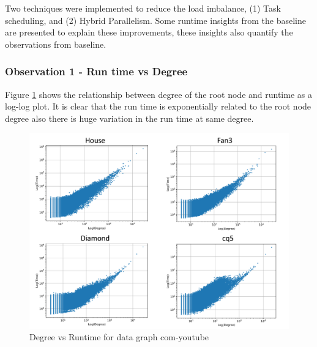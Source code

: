 {Two techniques were implemented to reduce the load imbalance, (1) Task scheduling, and (2) Hybrid Parallelism.
Some runtime insights from the baseline are presented to explain these improvements, these insights also quantify the observations from baseline.
\subsubsection*{Observation 1 - Run time vs Degree}
Figure \ref{fig:runtime-vs-degree} shows the relationship between degree of the root node and runtime as a log-log plot.
It is clear that the run time is exponentially related to the root node degree also there is huge variation in the run time at same degree.
\begin{figure}
    \includegraphics[width=\textwidth]{fig/improvements/time-vs-degree.png}
    \caption{Degree vs Runtime for data graph com-youtube}
    \label{fig:runtime-vs-degree}
\end{figure}

}
